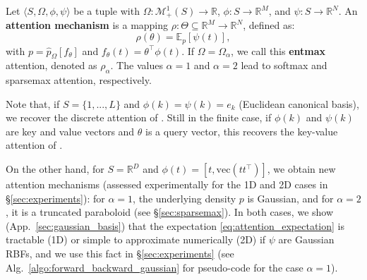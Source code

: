 \documentclass{article}
\begin{document}
\begin{definition}\label{def:attention_mechanism}
Let $\langle S, \Omega, \phi, \psi \rangle$ be a tuple with  $\Omega: \mathcal{M}_+^1(S) \rightarrow \mathbb{R}$, $\phi:S\rightarrow \mathbb{R}^M$, and $\psi:S\rightarrow \mathbb{R}^N$.
An \textbf{attention mechanism} is a mapping $\rho: \Theta \subseteq \mathbb{R}^M \rightarrow \mathbb{R}^N$, defined as:
\begin{equation}\label{eq:attention_expectation}
    \rho(\theta) = \mathbb{E}_{p}[\psi(t)],
\end{equation}
with $p = \hat{p}_\Omega[f_\theta]$ and $f_\theta(t) = \theta^\top \phi(t)$.
If $\Omega = \Omega_\alpha$, we  call this \textbf{entmax} attention, denoted as $\rho_\alpha$. The values $\alpha=1$ and $\alpha=2$ lead to softmax and sparsemax attention, respectively.
\end{definition}

Note that, if $S = \{1, ..., L\}$ and $\phi(k) = \psi(k) = e_k$ (Euclidean canonical basis), we recover the discrete attention of  \citet{bahdanau2014neural}.  
Still in the finite case, if $\phi(k)$ and $\psi(k)$ are key and value vectors and $\theta$ is a query vector, this recovers the key-value attention of \citet{vaswani2017attention}.  

On the other hand, for $S = \mathbb{R}^D$ and $\phi(t) = [t, \mathrm{vec}(tt^\top)]$, we obtain new attention mechanisms (assessed experimentally for the 1D and 2D cases 
in \S\ref{sec:experiments}): for $\alpha=1$, the underlying density $p$ is Gaussian, and for $\alpha=2$, it is a truncated paraboloid (see \S\ref{sec:sparsemax}). In both cases, we show (App.~\ref{sec:gaussian_basis}) that the expectation \eqref{eq:attention_expectation} is tractable (1D) or simple to approximate numerically (2D) if 
$\psi$ are Gaussian RBFs, and we use this fact in \S\ref{sec:experiments} (see  Alg.~\ref{algo:forward_backward_gaussian} for pseudo-code for the case $\alpha=1$).
\end{document}
